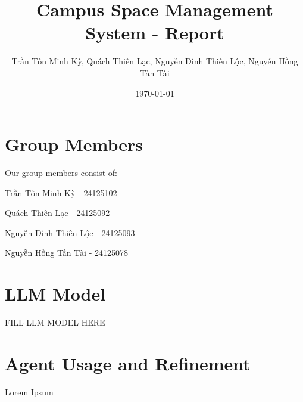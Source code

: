 \documentclass{exam}
\title{Campus Space Management System - Report}
\author{\foreignlanguage{vietnamese}{Trần Tôn Minh Kỳ, Quách Thiên Lạc, Nguyễn Đình Thiên Lộc, Nguyễn Hồng Tấn Tài}}
\date{\today}
\begin{document}
\maketitle
\section{Group Members}
Our group members consist of:

\foreignlanguage{vietnamese}{Trần Tôn Minh Kỳ} - 24125102

\foreignlanguage{vietnamese}{Quách Thiên Lạc} - 24125092

\foreignlanguage{vietnamese}{Nguyễn Đình Thiên Lộc} - 24125093

\foreignlanguage{vietnamese}{Nguyễn Hồng Tấn Tài} - 24125078

\section{LLM Model}
FILL LLM MODEL HERE

\section{Agent Usage and Refinement}
Lorem Ipsum
\end{document}
